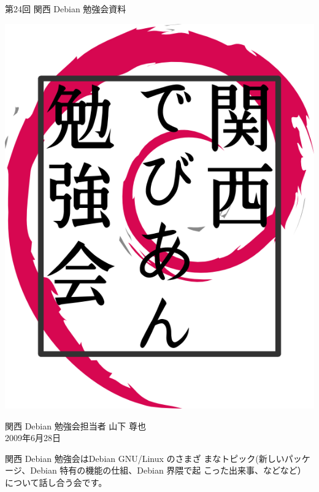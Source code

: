\documentclass[mingoth,a4paper]{jsarticle}
\newcommand{\debmtgyear}{2009}
\newcommand{\debmtgmonth}{6}
\newcommand{\debmtgdate}{28}
\newcommand{\debmtgnumber}{24}
\begin{document}
\begin{titlepage}


 第\debmtgnumber{}回 関西 Debian 勉強会資料

\vspace{2cm}

\begin{center}
\includegraphics{image200802/kansaidebianlogo.png}
\end{center}

\begin{flushright}
\hfill{}関西 Debian 勉強会担当者 山下 尊也\\
\hfill{}\debmtgyear{}年\debmtgmonth{}月\debmtgdate{}日
\end{flushright}

\thispagestyle{empty}
\end{titlepage}

 
 関西 Debian 勉強会はDebian GNU/Linux のさまざ
 まなトピック(新しいパッケージ、Debian 特有の機能の仕組、Debian 界隈で起
 こった出来事、などなど）について話し合う会です。
\end{document}
